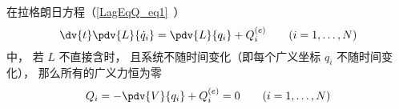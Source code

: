 
\begin{issues}
\issueDraft
\end{issues}


在拉格朗日方程（\autoref{LagEqQ_eq1}~）
\begin{equation}
\dv{t} \pdv{L}{\dot q_i} = \pdv{L}{q_i} + Q_i^{(e)}
\qquad (i=1,\dots,N)
\end{equation}
中， 若 $L$ 不直接含时， 且系统不随时间变化（即每个广义坐标 $q_i$ 不随时间变化）， 那么所有的广义力恒为零
\begin{equation}
Q_i = -\pdv{V}{q_i} + Q_i^{(e)} = 0 \qquad (i = 1,\dots,N)
\end{equation}

